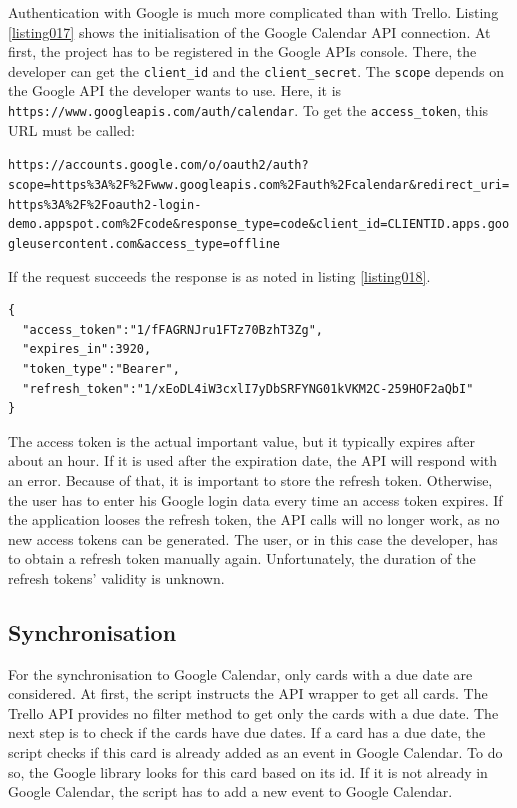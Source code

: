 Authentication with Google is much more complicated than with Trello. Listing \ref{listing017} shows the initialisation of the Google Calendar API connection. At first, the project has to be registered in the Google APIs console. \cite{google:apisconsole} There, the developer can get the \lstinline{client_id} and the \lstinline{client_secret}. The \lstinline{scope} depends on the Google API the developer wants to use. Here, it is \texttt{https://www.googleapis.com/auth/calendar}. \cite{google:apiscope} To get the \lstinline{access_token}, this URL must be called: 
\begin{center}
\lstinline{https://accounts.google.com/o/oauth2/auth?scope=https%3A%2F%2Fwww.googleapis.com%2Fauth%2Fcalendar&redirect_uri=https%3A%2F%2Foauth2-login-demo.appspot.com%2Fcode&response_type=code&client_id=CLIENTID.apps.googleusercontent.com&access_type=offline}
\end{center}

If the request succeeds the response is as noted in listing \ref{listing018}.

\begin{lstlisting}[aboveskip=1\baselineskip, caption=Response of the token request., label=listing018]
{
  "access_token":"1/fFAGRNJru1FTz70BzhT3Zg",
  "expires_in":3920,
  "token_type":"Bearer",
  "refresh_token":"1/xEoDL4iW3cxlI7yDbSRFYNG01kVKM2C-259HOF2aQbI"
}
\end{lstlisting}

The access token is the actual important value, but it typically expires after about an hour. If it is used after the expiration date, the API will respond with an error. Because of that, it is important to store the refresh token. Otherwise, the user has to enter his Google login data every time an access token expires. If the application looses the refresh token, the API calls will no longer work, as no new access tokens can be generated. The user, or in this case the developer, has to obtain a refresh token manually again. \cite{google:calapi} Unfortunately, the duration of the refresh tokens' validity is unknown.

\subsection{Synchronisation}
For the synchronisation to Google Calendar, only cards with a due date are considered. At first, the script instructs the API wrapper to get all cards. The Trello API provides no filter method to get only the cards with a due date. The next step is to check if the cards have due dates. If a card has a due date, the script checks if this card is already added as an event in Google Calendar. To do so, the Google library looks for this card based on its id. If it is not already in Google Calendar, the script has to add a new event to Google Calendar.

